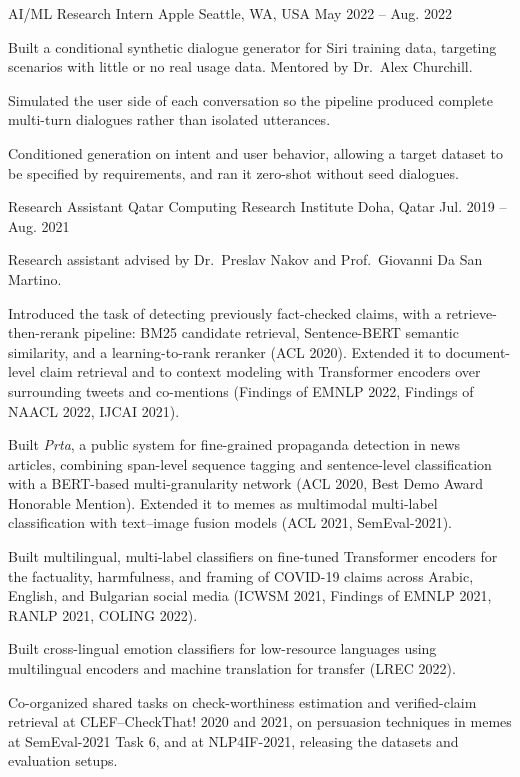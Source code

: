 \begin{cventries}
  \cventry
    {AI/ML Research Intern}
    {Apple}
    {Seattle, WA, USA}
    {May 2022 -- Aug. 2022}
    {
      \begin{cvitems}
        \item Built a conditional synthetic dialogue generator for Siri training data, targeting scenarios with little or no real usage data. Mentored by Dr.\ Alex Churchill.
        \item Simulated the user side of each conversation so the pipeline produced complete multi-turn dialogues rather than isolated utterances.
        \item Conditioned generation on intent and user behavior, allowing a target dataset to be specified by requirements, and ran it zero-shot without seed dialogues.
      \end{cvitems}
    }

  \cventry
    {Research Assistant}
    {Qatar Computing Research Institute}
    {Doha, Qatar}
    {Jul. 2019 -- Aug. 2021}
    {
      \begin{cvitems}
        \item Research assistant advised by Dr.\ Preslav Nakov and Prof.\ Giovanni Da San Martino.
        \item Introduced the task of detecting previously fact-checked claims, with a retrieve-then-rerank pipeline: BM25 candidate retrieval, Sentence-BERT semantic similarity, and a learning-to-rank reranker (ACL 2020). Extended it to document-level claim retrieval and to context modeling with Transformer encoders over surrounding tweets and co-mentions (Findings of EMNLP 2022, Findings of NAACL 2022, IJCAI 2021).
        \item Built \textit{Prta}, a public system for fine-grained propaganda detection in news articles, combining span-level sequence tagging and sentence-level classification with a BERT-based multi-granularity network (ACL 2020, Best Demo Award Honorable Mention). Extended it to memes as multimodal multi-label classification with text--image fusion models (ACL 2021, SemEval-2021).
        \item Built multilingual, multi-label classifiers on fine-tuned Transformer encoders for the factuality, harmfulness, and framing of COVID-19 claims across Arabic, English, and Bulgarian social media (ICWSM 2021, Findings of EMNLP 2021, RANLP 2021, COLING 2022).
        \item Built cross-lingual emotion classifiers for low-resource languages using multilingual encoders and machine translation for transfer (LREC 2022).
        \item Co-organized shared tasks on check-worthiness estimation and verified-claim retrieval at CLEF--CheckThat! 2020 and 2021, on persuasion techniques in memes at SemEval-2021 Task 6, and at NLP4IF-2021, releasing the datasets and evaluation setups.
      \end{cvitems}
    }


\end{cventries}
